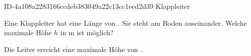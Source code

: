 \begin{exercise}
      {ID-4a108a2283166ccdeb383049a22c13cc1eed2d39}
      {Klappleiter}
  \ifproblem\problem\par
    Eine Klappleiter hat eine Länge von . Sie steht am Boden
     auseinander. Welche maximale Höhe $h$ in m ist möglich?
  \fi
  \ifoutcome\outcome\par
    Die Leiter erreicht eine maximale Höhe von .
  \fi
\end{exercise}
